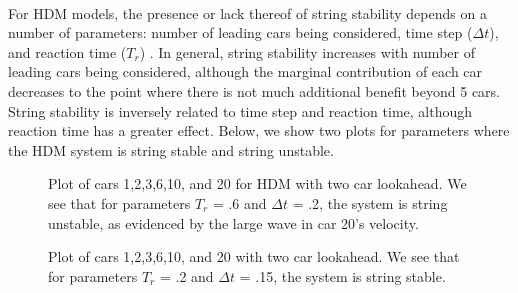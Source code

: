 \documentclass[12pt]{article}
\begin{document}
\paragraph{}For HDM models, the presence or lack thereof of string stability depends on a number of parameters: number of leading cars being considered, time step ($\Delta t$), and reaction time ($T_r$) \cite[chapter~15]{treiber_kesting_2013}. In general, string stability increases with number of leading cars being considered, although the marginal contribution of each car decreases to the point where there is not much additional benefit beyond 5 cars. String stability is inversely related to time step and reaction time, although reaction time has a greater effect. Below, we show two plots for parameters where the HDM system is string stable and string unstable.

\begin{figure}[H]
  \centering
  \caption{Plot of cars 1,2,3,6,10, and 20 for HDM with two car lookahead. We see that for parameters $T_r$ = .6 and $\Delta t$ = .2, the system is string unstable, as evidenced by the large wave in car 20's velocity.}
\end{figure}

\begin{figure}[H]
  \centering
  \caption{Plot of cars 1,2,3,6,10, and 20 with two car lookahead. We see that for parameters $T_r$ = .2 and $\Delta t$ = .15, the system is string stable.}
\end{figure}
\end{document}
